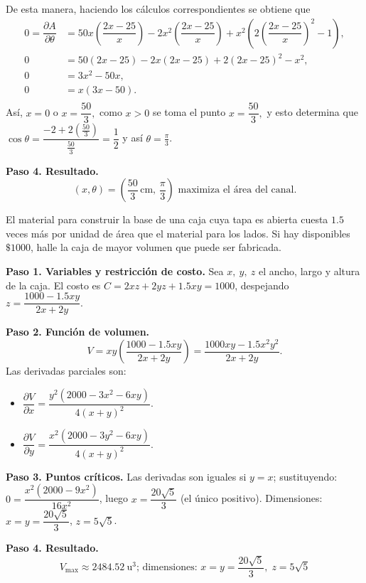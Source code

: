 \begin{prob}
\begin{myproof}
De esta manera, haciendo los cálculos correspondientes se obtiene que
\begin{align*}
0=\dfrac{\partial A}{\partial \theta}&=50x\left(\dfrac{2x-25}{x}\right)-2x^2\left(\dfrac{2x-25}{x}\right)+x^2\left(2\left(\dfrac{2x-25}{x}\right)^{2}-1\right),\\
0&=50\left(2x-25\right)-2x\left(2x-25\right)+2\left( 2x-25 \right)^2-x^2,\\
0&=3x^2-50x,\\
0&=x(3x-50).\\
\end{align*}
Así, $x=0$  o $x=\dfrac{50}{3},$ como $x>0$ se toma el punto $x=\dfrac{50}{3},$ y esto determina que $\cos \theta =\dfrac{-2+2\left( \frac{50}{3} \right)}{\frac{50}{3}}=\dfrac{1}{2}$  y así $\theta=\frac{\pi}{3}$.

\textbf{Paso 4. Resultado.}
\[
\boxed{(x,\theta)=\left(\dfrac{50}{3}\,\text{cm},\,\dfrac{\pi}{3}\right)\text{ maximiza el área del canal}.}
\]
\end{myproof}
\end{prob}

\begin{prob}
El material para construir la base de una caja cuya tapa es abierta cuesta $1.5$ veces más por unidad de área que el material para los lados. Si hay disponibles $\$ 1 000$, halle la caja de mayor volumen que puede ser fabricada.
\begin{myproof}
\textbf{Paso 1. Variables y restricción de costo.}
Sea $x,\ y,\ z$ el ancho, largo y altura de la caja. El costo es $C=2xz+2yz+1.5xy=1000$, despejando $z=\dfrac{1000-1.5xy}{2x+2y}.$

\textbf{Paso 2. Función de volumen.}
$$V=xy\left(\dfrac{1000-1.5xy}{2x+2y}\right)=\dfrac{1000xy-1.5x^2y^2}{2x+2y}.$$
Las derivadas parciales son:
\begin{itemize}
\item $\dfrac{\partial V}{\partial x}=\dfrac{y^{2}\left(2000-3x^2-6xy\right)}{4\left(x+y\right)^{2}}.$
\item $\dfrac{\partial V}{\partial y}=\dfrac{x^{2}\left(2000-3y^2-6xy\right)}{4\left(x+y\right)^{2}}.$
\end{itemize}

\textbf{Paso 3. Puntos críticos.}
Las derivadas son iguales si $y=x$; sustituyendo: $0=\dfrac{x^2(2000-9x^2)}{16x^2}$, luego $x=\dfrac{20\sqrt{5}}{3}$ (el único positivo). Dimensiones: $x=y=\dfrac{20\sqrt{5}}{3}$, $z=5\sqrt{5}$.

\textbf{Paso 4. Resultado.}
\[
\boxed{V_{\max}\approx 2484.52\ \text{u}^3\text{; dimensiones: }x=y=\dfrac{20\sqrt{5}}{3},\;z=5\sqrt{5}}
\]
\end{myproof}
\end{prob}

